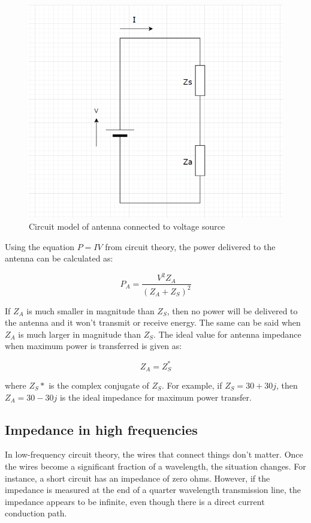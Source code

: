 \documentclass[a4paper,12pt]{report}
\begin{document}
\begin{figure}
  \begin{center}
    \includegraphics[clip, keepaspectratio, width=0.5\linewidth]{img/low_freq_circuit_diagram.png}
    \caption{Circuit model of antenna connected to voltage source}
    \label{fig:low_freq_circuit_diagram}
  \end{center}
\end{figure}

Using the equation $P=IV$ from circuit theory,
the power delivered to the antenna can be calculated as:

\begin{equation}
  P_A = \frac{V^2 Z_A}{(Z_A + Z_S) ^2}
\end{equation}

If $Z_A$ is much smaller in magnitude than $Z_S$,
then no power will be delivered to the antenna and
it won't transmit or receive energy.
The same can be said when $Z_A$ is much larger in magnitude than $Z_S$.
The ideal value for antenna impedance when maximum power is transferred is given as:

\begin{equation}
  Z_A = Z_S^*
\end{equation}

where $Z_S*$ is the complex conjugate of $Z_S$.
For example, if $Z_S = 30 + 30j$, then $Z_A = 30 - 30j$ is the ideal
impedance for maximum power transfer.

\subsection{Impedance in high frequencies}

In low-frequency circuit theory, the wires that connect things don't matter.
Once the wires become a significant fraction of a wavelength,
the situation changes. For instance,
a short circuit has an impedance of zero ohms. However,
if the impedance is measured at the end of a quarter wavelength transmission line,
the impedance appears to be infinite,
even though there is a direct current conduction path.
\end{document}

